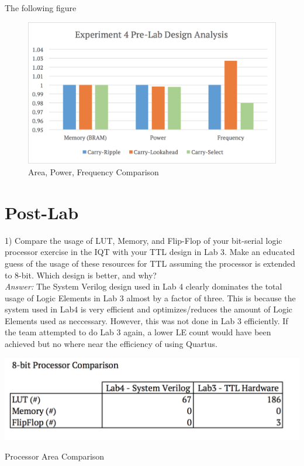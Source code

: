 \documentclass[journal, twocolumn, final,11pt,letterpaper]{IEEEtran}
\begin{document}
The following figure 

\begin{figure} [H]
	\centering
	\includegraphics[scale=0.35]{pre-lab-design-analysis.png}
	\caption{Area, Power, Frequency Comparison\label{fig:pre-lab-design-analysis}}
\end{figure}


\section{Post-Lab}
1) Compare the usage of LUT, Memory, and Flip-Flop of your bit-serial logic processor
exercise in the IQT with your TTL design in Lab 3. Make an educated guess of the usage of
these resources for TTL assuming the processor is extended to 8-bit. Which design is better, and
why? \\

\textit{Answer:} The System Verilog design used in Lab 4 clearly dominates the total usage of Logic Elements in Lab 3 almost by a factor of three. This is because the system used in Lab4 is very efficient and optimizes/reduces the amount of Logic Elements used as neccessary. However, this was not done in Lab 3 efficiently. If the team attempted to do Lab 3 again, a lower LE count would have been achieved but no where near the efficiency of using Quartus.
\begin{table} [H]
	\centering
	\includegraphics[scale=0.35]{processor-comparison.png}
	\caption{Processor Area Comparison\label{tab:processor-comparison}}
\end{table}
\end{document}
